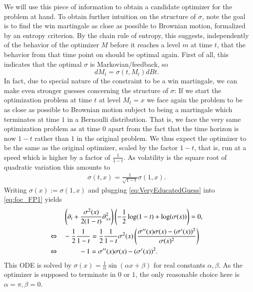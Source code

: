 \documentclass[reqno, a4paper]{amsart}
\theoremstyle{remark}
\newcommand{\1}{\mathbbm 1}
\numberwithin{equation}{section}
\numberwithin{theorem}{section}
\newcommand{\MBshort}[1]{\marginpar{\color{purple}{[MB: #1]}}}
\begin{document}
We will use this piece of information to obtain a candidate optimizer for the problem at hand.
To obtain further intuition on the structure of $\sigma$, note the goal is to find the win martingale  as close as possible to Brownian motion, formalized  by an entropy criterion. By the chain rule of entropy, this suggests, independently of the behavior of the optimizer $M$ before it reaches a level $m$ at time $t$, that the behavior from that time point on should be optimal again. First of all, this indicates that the optimal $\sigma$ is Markovian/feedback, so 
$$dM_t=\sigma(t,M_t)dBt.$$ 
In fact, due to special nature of the constraint to be a win martingale, we can make even stronger guesses concerning the structure of $\sigma$: If we start the optimization problem at time $t$ at level $M_t=x$ we face again the problem to be as close as possible to Brownian motion subject to being a martingale which terminates at time $1$ in a Bernoulli distribution. That is, we face the very same optimization problem as at time $0$ apart from the fact that the time horizon is now $1-t$ rather than $1$ in the original problem. We thus expect the optimizer to be the same as the original optimizer, scaled by the factor $1-t$, that is, run at a speed which is higher by a factor of $\frac 1{1-t}.$ As volatility is the square root of quadratic variation this amounts to  
\begin{align}\label{eq:VeryEducatedGuess}
\sigma(t, x) = \frac1 {\sqrt{1-t}} \sigma(1,x).
\end{align}
Writing $\sigma(x):= \sigma(1,x)$ and plugging \eqref{eq:VeryEducatedGuess}  into \eqref{eq:foc_FP1} yields
\begin{align*}
 & \left(\partial_t+\frac{\sigma^2(x)}{2 (1-t)}\partial^2_{xx}\right)\left(  -\frac 12 \log(1-t)  + \log(\sigma(x)) \right) =0,\\
\Leftrightarrow \quad  & -\frac 12 \frac1{1-t} = \frac 12 \frac1{1-t} \sigma^2(x) \left(\frac{ \sigma''(x) \sigma(x) - (\sigma'(x))^2}{\sigma(x)^2} \right)\\
\Leftrightarrow \quad &\hspace{8mm} -1 = \sigma''(x) \sigma(x) - (\sigma'(x))^2.
\end{align*}
This ODE is solved by $\sigma(x)= \frac 1 \alpha \sin(\alpha x + \beta)$ for real constants $\alpha, \beta$. As the optimizer is supposed to terminate in $0$ or $1$, the only reasonable choice here is $\alpha= \pi, \beta = 0$. 
%
%
%
\end{document}
